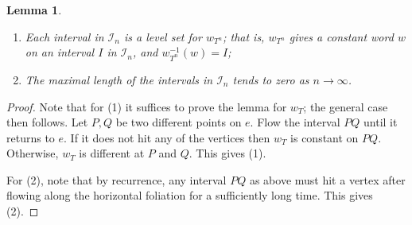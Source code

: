 \documentclass[11pt]{article} %
\theoremstyle{plain}
\newtheorem{lm}[thm]{Lemma}
\theoremstyle{definition}
\numberwithin{equation}{section}
\begin{document}
\begin{lm} \label{split}
\begin{enumerate}[label=\normalfont{(\arabic*)}, topsep=0mm, itemsep=0mm]
    \item Each interval in $\mathcal{I}_n$ is a level set for $w_{T^n}$; that is, $w_{T^n}$ gives a constant word $w$ on an interval $I$ in $\mathcal{I}_n$, and $w_{T^n}^{-1}(w)=I$;
    \item The maximal length of the intervals in $\mathcal{I}_n$ tends to zero as $n \to \infty$.
\end{enumerate}  
\end{lm}
\begin{proof}
Note that for (1) it suffices to prove the lemma for $w_T$; the general case then follows. Let $P,Q$ be two different points on $e$. Flow the interval $PQ$ until it returns to $e$. If it does not hit any of the vertices then $w_T$ is constant on $PQ$. Otherwise, $w_T$ is different at $P$ and $Q$. This gives (1).

For (2), note that by recurrence, any interval $PQ$ as above must hit a vertex after flowing along the horizontal foliation for a sufficiently long time. This gives (2).
\end{proof}
\end{document}
